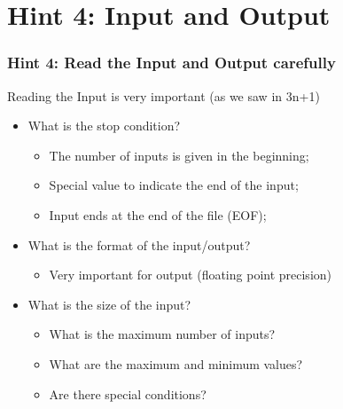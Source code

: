 

%
%

\section{Hint 4: Input and Output}
\begin{frame}
  \frametitle{Hint 4: Read the Input and Output carefully}
  Reading the Input is \alert{very important} (as we saw in 3n+1)
  \bigskip

  \begin{itemize}
  \item What is the stop condition?
  \begin{itemize}
    \item The number of inputs is given in the beginning;
    \item Special value to indicate the end of the input;
    \item Input ends at the end of the file (EOF);
  \end{itemize}
  \medskip

  \item What is the format of the input/output?
  \begin{itemize}
    \item Very important for output (floating point precision)
  \end{itemize}
  \medskip

  \item What is the size of the input?
  \begin{itemize}
    \item What is the maximum number of inputs?
    \item What are the maximum and minimum values?
    \item Are there special conditions?
  \end{itemize}
  \end{itemize}
\end{frame}


